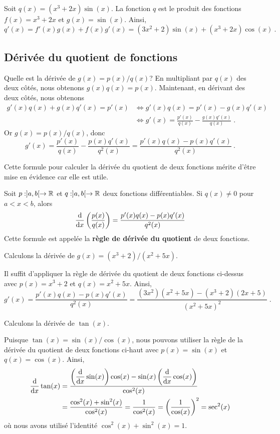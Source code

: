 {\begin{egg}
Soit $q(x) = (x^3+2x)\sin(x)$.  La fonction $q$ est le produit des
fonctions $f(x) = x^3+2x$ et $g(x) = \sin(x)$.  Ainsi,
\[
q'(x) = f'(x) g(x) + f(x) g'(x) = (3x^2 +2)\sin(x) + (x^3+2x)\cos(x) \ .
\]
\end{egg}

\subsection{Dérivée du quotient de fonctions}

Quelle est la dérivée de $g(x) = p(x) / q(x)$?  En multipliant par
$q(x)$ des deux côtés, nous obtenons $g(x) q(x) = p(x)$.  Maintenant, en
dérivant des deux côtés, nous obtenons
\begin{align*}
g'(x) q(x) + g(x) q'(x) = p'(x)
&\Leftrightarrow g'(x) q(x) = p'(x) - g(x) q'(x) \\
&\Leftrightarrow g'(x) = \frac{p'(x)}{q(x)} - \frac{g(x) q'(x)}{q(x)} \; .
\end{align*}
Or $g(x) = p(x) / q(x)$, donc
\[
g'(x) = \frac{p'(x)}{q(x)} - \frac{p(x) q'(x)}{q^2(x)}
= \frac{p'(x) q(x) - p(x) q'(x)}{q^2(x)} \ .
\]

Cette formule pour calculer la dérivée du quotient de deux fonctions
mérite d'être mise en évidence car elle est utile.

\begin{prop} 
Soit $p:]a,b[\to \RR$ et $q:]a,b[\to \RR$ deux fonctions
différentiables.  Si $q(x) \neq 0$ pour $a<x<b$, alors
\[
\dfdx{\left(\frac{p(x)}{q(x)}\right)}{x}
= \frac{p'(x) q(x) - p(x) q'(x)}{q^2(x)}
\]
Cette formule est appelée la {\bfseries règle de dérivée du
quotient} de deux fonctions.
\end{prop}

\begin{egg}
Calculons la dérivée de $g(x) = (x^3+2)/(x^2+5x)$.

Il suffit d'appliquer la règle de dérivée du quotient de deux
fonctions ci-dessus avec $p(x) = x^3+2$ et $q(x) = x^2+5x$.  Ainsi,
\[
g'(x) = \frac{p'(x) q(x) - p(x) q'(x)}{q^2(x)}
= \frac{(3x^2)(x^2+5x) - (x^3+2)(2x+5)}{(x^2+5x)^2} \; .
\]
\end{egg}

\begin{egg}
Calculons la dérivée de $\tan(x)$.

Puisque $\tan(x) = \sin(x) / \cos(x)$, nous pouvons utiliser la règle de la
dérivée du quotient de deux fonctions ci-haut avec
$p(x) = \sin(x)$ et $q(x) = \cos(x)$.  Ainsi,
\begin{align*}
\dfdx{\tan(x)}{x} &= \frac{\left(\displaystyle \dfdx{\sin(x)}{x}\right) \cos(x)
- \sin(x) \left(\displaystyle \dfdx{\cos(x)}{x}\right)}{\cos^2(x)} \\
&= \frac{ \cos^2(x) + \sin^2(x)}{\cos^2(x)}
= \frac{1}{\cos^2(x)}
= \left(\frac{1}{\cos(x)}\right)^2 = \sec^2(x)
\end{align*}
où nous avons utilisé l'identité $\cos^2(x) + \sin^2(x) = 1$.
\end{egg}

}
